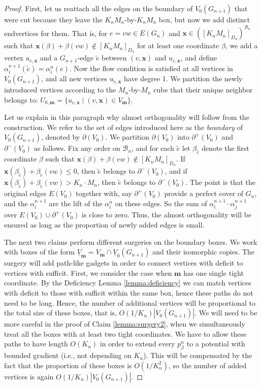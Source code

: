 \documentclass[10pt,a4paper]{amsart}
\begin{document}
\begin{proof}

First, let us reattach all the edges on the boundary of $V_0(G_{n+1})$ that were cut because they leave the $K_n M_n$-by-$K_nM_n$ box, but now we add distinct endvertices for them. That is, for $e=vw \in E(G_n)$ and $\mathbf{x} \in ([K_n M_n]_{D_n})^{\mathcal{B}_n}$ such that $\mathbf{x}(\beta) + \beta(vw) \notin [K_n M_n]_{D_n}$ for at least one coordinate $\beta$, we add a vertex $u_{e,\mathbf{x}}$ and a $G_{n+1}$-edge $\tilde{e}$ between $(v,\mathbf{x})$ and $u_{e,\mathbf{x}}$, and define $\alpha^{n+1}_i(\tilde{e}) = \alpha^n_i(e)$. Now the flow condition is satisfied at all vertices in $V_0(G_{n+1})$, and all new vertices $u_{e,\mathbf{x}}$ have degree 1. We partition the newly introduced vertices according to the $M_n$-by-$M_n$ cube that their unique neighbor belongs to: $U_{0,\mathbf{m}}=\{u_{e,\mathbf{x}} \mid (v,\mathbf{x}) \in V_{\mathbf{m}}\}$.

Let us explain in this paragraph why almost orthogonality will follow from the construction.
We refer to the set of edges introduced here as the \emph{boundary} of $V_0(G_{n+1})$, denoted by $\partial(V_0)$. We partition $\partial(V_0)$ into $\partial^{+}(V_0)$ and $\partial^{-}(V_0)$ as follows. Fix any order on $\mathcal{B}_n$, and for each $\tilde{e}$ let $\beta_{\tilde{e}}$ denote the first coordinate $\beta$ such that $\mathbf{x}(\beta) + \beta(vw) \notin [K_n M_n]_{D_n}$. If $\mathbf{x}(\beta_{\tilde{e}}) + \beta_{\tilde{e}}(vw) \leq 0$, then $\tilde{e}$ belongs to $\partial^{-}(V_0)$, and if $\mathbf{x}(\beta_{\tilde{e}}) + \beta_{\tilde{e}}(vw) > K_n \cdot M_n$, then $\tilde{e}$ belongs to $\partial^{-}(V_0)$. The point is that the original edges $E(V_0)$ together with, say $\partial^{+}(V_0)$ provide a perfect cover of $G_n$, and the $\alpha^{n+1}_i$ are the lift of the $\alpha^{n}_i$ on these edges. So the sum of $\alpha^{n+1}_i\cdot \alpha^{n+1}_j$ over $E(V_0)\cup\partial^{+}(V_0)$ is close to zero. Thus, the almost orthogonality will be ensured as long as the proportion of newly added edges is small. 

The next two claims perform different surgeries on the boundary boxes. We work with boxes of the form $\underline{V}_{\mathbf{m}}=V_{\mathbf{m}} \cap \underline{V}_0({G_{n+1}})$ and their isomorphic copies. The surgery will add path-like gadgets in order to connect vertices with deficit to vertices with sufficit. First, we consider the case when $\mathbf{m}$ has one single tight coordinate. By the Deficiency Lemma \ref{lemma:deficiency} we can match vertices with deficit to those with sufficit within the same box, hence these paths do not need to be long. Hence, the number of additional vertices will be proportional to the total size of these boxes, that is, $O(1/K_n)|V_0(G_{n+1})|$. We will need to be more careful in the proof of Claim \ref{lemma:surgery2}, when we simultaneously treat all the boxes with at least two tight coordinates. We have to allow these paths to have length $O(K_n)$ in order to extend every $p_{\beta}^n$ to a potential with bounded gradient (i.e., not depending on $K_n$). This will be compensated by the fact that the proportion of these boxes is $O(1/K_n^2)$, so the number of added vertices is again $O(1/K_n)|V_0(G_{n+1})|$.


\end{proof}
\end{document}
